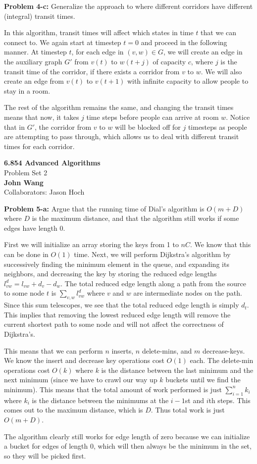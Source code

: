 \documentclass[psamsfonts]{amsart}
\newenvironment{sol}{\vspace{0.25cm}{\large \bfseries Solution:}}{\qedsymbol}
\newenvironment{prob}[1]{\begin{framed}{\large \bfseries Problem #1:}}{\end{framed}}
\newcommand{\makenewtitle}{
    \begin{center}
    {\huge \bfseries 6.854 Advanced Algorithms} \\
    Problem Set 2\\
    \vspace{0.25cm}
    {\bfseries John Wang} \\
    Collaborators: Jason Hoch
    \end{center}
    \vspace{0.5cm}
}
\begin{document}
\begin{prob}{4-c}
Generalize the approach to where different corridors have different (integral) transit times.
\end{prob}
\begin{sol}
In this algorithm, transit times will affect which states in time $t$ that we can connect to. We again start at timestep $t=0$ and proceed in the following manner. At timestep $t$, for each edge in $(v,w) \in G$, we will create an edge in the auxiliary graph $G'$ from $v(t)$ to $w(t+j)$ of capacity $c$, where $j$ is the transit time of the corridor, if there exists a corridor from $v$ to $w$. We will also create an edge from $v(t)$ to $v(t+1)$ with infinite capacity to allow people to stay in a room.

The rest of the algorithm remains the same, and changing the transit times means that now, it takes $j$ time steps before people can arrive at room $w$. Notice that in $G'$, the corridor from $v$ to $w$ will be blocked off for $j$ timesteps as people are attempting to pass through, which allows us to deal with different transit times for each corridor. 
\end{sol}

\newpage
\makenewtitle

\begin{prob}{5-a}
Argue that the running time of Dial's algorithm is $O(m+D)$ where $D$ is the maximum distance, and that the algorithm still works if some edges have length 0.
\end{prob}
\begin{sol}
First we will initialize an array storing the keys from 1 to $nC$. We know that this can be done in $O(1)$ time. Next, we will perform Dijkstra's algorithm by successively finding the minimum element in the queue, and expanding its neighbors, and decreasing the key by storing the reduced edge lengths $l_{vw}^d = l_{vw} + d_v - d_w$. The total reduced edge length along a path from the source to some node $t$ is $\sum_{v,w} l_{vw}^d$ where $v$ and $w$ are intermediate nodes on the path. Since this sum telescopes, we see that the total reduced edge length is simply $d_t$. This implies that removing the lowest reduced edge length will remove the current shortest path to some node and will not affect the correctness of Dijkstra's.

This means that we can perform $n$ inserts, $n$ delete-mins, and $m$ decrease-keys. We know the insert and decrease key operations cost $O(1)$ each. The delete-min operations cost $O(k)$ where $k$ is the distance between the last minimum and the next minimum (since we have to crawl our way up $k$ buckets until we find the minimum). This means that the total amount of work performed is just $\sum_{i=1}^n k_i$ where $k_i$ is the distance between the minimums at the $i-1$st and $i$th steps. This comes out to the maximum distance, which is $D$. Thus total work is just $O(m + D)$. 

The algorithm clearly still works for edge length of zero because we can initialize a bucket for edges of length 0, which will then always be the minimum in the set, so they will be picked first.
\end{sol}
\end{document}
